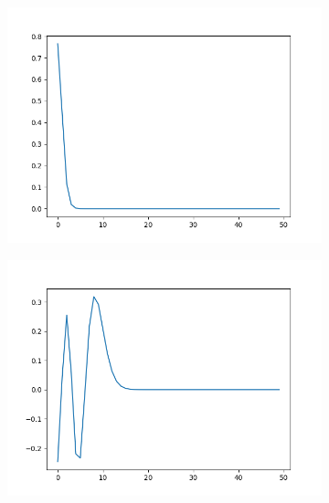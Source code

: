 \begin{figure}[h]
    \centering
    \begin{subfigure}{0.3\linewidth}
        \includegraphics[width=\linewidth]{figures/result1.png}
    \end{subfigure}
    \begin{subfigure}{0.3\linewidth}
        \includegraphics[width=\linewidth]{figures/result10.png}
    \end{subfigure}
    \begin{subfigure}{0.3\linewidth}

\end{subfigure}
\end{figure}
